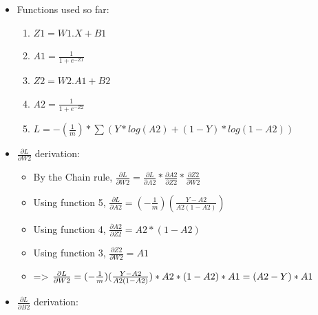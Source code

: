 \documentclass[10pt,a4paper]{article}
\begin{document}
\begin{itemize}
    \item Functions used so far:
    \begin{enumerate}
        \item $Z1 = W1 . X + B1$
        \item $A1 = \frac{1}{1+e^{-Z1}}$
        \item $Z2 = W2 . A1 + B2$
        \item $A2 = \frac{1}{1+e^{-Z2}}$
        \item $L = -(\frac{1}{m}) * \sum(Y * log(A2) + (1-Y) * log(1-A2))$
    \end{enumerate}
    \item $\frac{\partial{L}}{\partial{W2}}$ derivation:
    \begin{itemize}
        \item By the Chain rule, $\frac{\partial{L}}{\partial{W2}} = \frac{\partial{L}}{\partial{A2}} * \frac{\partial{A2}}{\partial{Z2}} * \frac{\partial{Z2}}{\partial{W2}}$
        \item Using function 5, $\frac{\partial{L}}{\partial{A2}} = (-\frac{1}{m})(\frac{Y-A2}{A2(1-A2)})$
        \item Using function 4, $\frac{\partial{A2}}{\partial{Z2}} = A2 * (1-A2)$
        \item Using function 3, $\frac{\partial{Z2}}{\partial{W2}} = A1$
        \item => $\frac{\partial{L}}{\partial{W2}} = (-\frac{1}{m})(\frac{Y-A2}{A2(1-A2)}) * A2 * (1-A2) * A1\\
              = (A2-Y) * A1$
    \end{itemize}
    \item $\frac{\partial{L}}{\partial{B2}}$ derivation:
\end{itemize}
\end{document}
